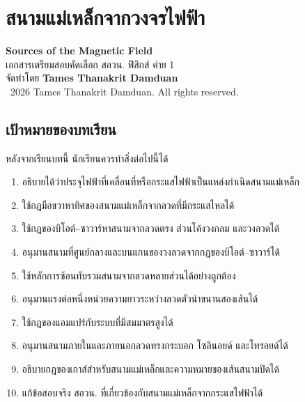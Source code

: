 %

\chapter{สนามแม่เหล็กจากวงจรไฟฟ้า}

\begin{center}
    {\Large \textbf{Sources of the Magnetic Field}}\\[4pt]
    {\normalsize เอกสารเตรียมสอบคัดเลือก สอวน. ฟิสิกส์ ค่าย 1}\\[6pt]
    {\normalsize จัดทำโดย \textbf{Tames Thanakrit Damduan}}\\[2pt]
    {\footnotesize \textcopyright\ 2026 Tames Thanakrit Damduan. All rights reserved.}\\[8pt]
\end{center}

\section*{เป้าหมายของบทเรียน}

หลังจากเรียนบทนี้ นักเรียนควรทำสิ่งต่อไปนี้ได้

\begin{enumerate}
    \item อธิบายได้ว่าประจุไฟฟ้าที่เคลื่อนที่หรือกระแสไฟฟ้าเป็นแหล่งกำเนิดสนามแม่เหล็ก
    \item ใช้กฎมือขวาหาทิศของสนามแม่เหล็กจากลวดที่มีกระแสไหลได้
    \item ใช้กฎของบิโอต์--ซาวาร์หาสนามจากลวดตรง ส่วนโค้งวงกลม และวงลวดได้
    \item อนุมานสนามที่ศูนย์กลางและบนแกนของวงลวดจากกฎของบิโอต์--ซาวาร์ได้
    \item ใช้หลักการซ้อนทับรวมสนามจากลวดหลายส่วนได้อย่างถูกต้อง
    \item อนุมานแรงต่อหนึ่งหน่วยความยาวระหว่างลวดตัวนำขนานสองเส้นได้
    \item ใช้กฎของแอมแปร์กับระบบที่มีสมมาตรสูงได้
    \item อนุมานสนามภายในและภายนอกลวดทรงกระบอก โซลินอยด์ และโทรอยด์ได้
    \item อธิบายกฎของเกาส์สำหรับสนามแม่เหล็กและความหมายของเส้นสนามปิดได้
    \item แก้ข้อสอบจริง สอวน. ที่เกี่ยวข้องกับสนามแม่เหล็กจากกระแสไฟฟ้าได้
\end{enumerate}


